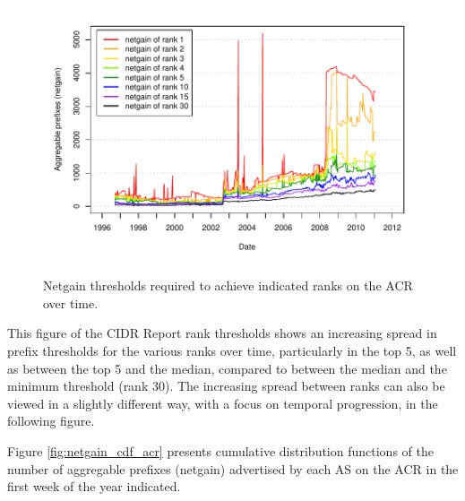\begin{figure}[h!]
\begin{centering}
\begin{singlespace}
    \includegraphics[width=6in]{figures/acr_netgain_time.pdf}
    \vspace{-2em}\\
    \caption{Netgain thresholds required to achieve indicated ranks on the ACR
    over time.}
    \label{fig:thresholds}
    \end{singlespace}
\end{centering}
\end{figure}


This figure of the CIDR Report rank thresholds shows an increasing spread in
prefix thresholds for the various ranks over time, particularly in the top 5,
as well as between the top 5 and the median, compared to between the median and
the minimum threshold (rank 30). The increasing spread between ranks can also
be viewed in a slightly different way, with a focus on temporal progression, in
the following figure.

Figure \ref{fig:netgain_cdf_acr} presents cumulative
distribution functions of the number of aggregable prefixes (netgain)
advertised by each AS on the ACR in the first week of the year indicated.

